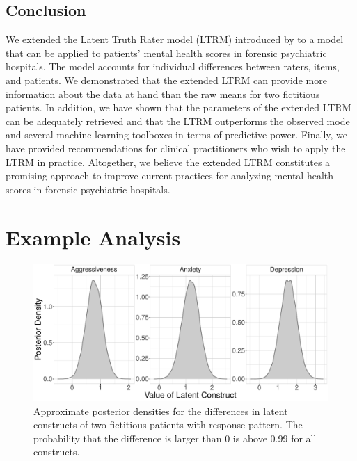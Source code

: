 \documentclass[a4paper,usenames,dvipsnames]{article}
\begin{document}
\subsection*{Conclusion}
We extended the Latent Truth Rater model (LTRM) introduced by  to a model that can be applied to patients' mental health scores in forensic psychiatric hospitals. The model accounts for individual differences between raters, items, and patients. We demonstrated that the extended LTRM can provide more information about the data at hand than the raw means for two fictitious patients. In addition, we have shown that the parameters of the extended LTRM can be adequately retrieved and that the LTRM outperforms the observed mode and several machine learning toolboxes in terms of predictive power. Finally, we have provided recommendations for clinical practitioners who wish to apply the LTRM in practice. Altogether, we believe the extended LTRM constitutes a promising approach to improve current practices for analyzing mental health scores in forensic psychiatric hospitals. 





\newpage
\appendix
{}

\section{Example Analysis}

\begin{figure}[!ht]
	\includegraphics[width=\textwidth]{figures/twoPatientsDiffDensity.pdf}
	\caption{Approximate posterior densities for the differences in latent constructs of two fictitious patients with response pattern. The probability that the difference is larger than 0 is above $0.99$ for all constructs.}
	\label{fig:ExamplePosteriorDiff}
\end{figure}
\end{document}

